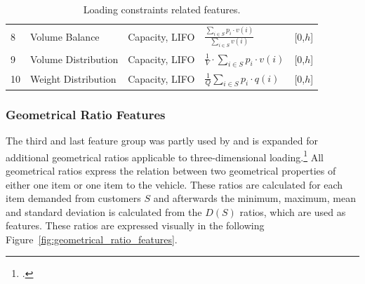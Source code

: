 \begin{table}[!h]
\begin{tabular}{@{}P{0.08\textwidth}P{0.16\textwidth}P{0.26\textwidth}P{0.28\textwidth}@{}P{0.1\textwidth}@{}}
        8  & Volume Balance                                                                                  & Capacity, \gls{LIFO}   & $\frac{\displaystyle\sum\nolimits_{i \in S}p_i \cdot v(i)}{\displaystyle\sum\nolimits_{i \in S}v(i)}$ & [0,$h$] \\
        9  & Volume Distribution                                                                             & Capacity, \gls{LIFO}   & $\displaystyle\frac{1}{V}\cdot\sum_{i \in S}p_i \cdot v(i)$                                           & [0,$h$] \\
        10 & Weight Distribution                                                                             & Capacity, \gls{LIFO}   & $\displaystyle\frac{1}{Q}\sum_{i \in S}p_i \cdot q(i)$                                                & [0,$h$] \\
        \bottomrule
    \end{tabular}
    \caption{Loading constraints related features.}
    \label{tab:loading_constraints_features}
\end{table}


\subsubsection{Geometrical Ratio Features}
The third and last feature group
was partly used by \cite{zhang_learning-based_2022} and is expanded for additional geometrical ratios applicable to three-dimensional loading.\footcite[cf.][p. 14]{zhang_learning-based_2022}
All geometrical ratios express the relation between two geometrical properties of either one item or one item to the vehicle. These ratios
are calculated for each item demanded from customers $S$ and afterwards the minimum, maximum, mean and standard deviation is calculated
from the $D(S)$ ratios, which are used as features. These ratios are expressed visually in the following Figure~\ref{fig:geometrical_ratio_features}.


